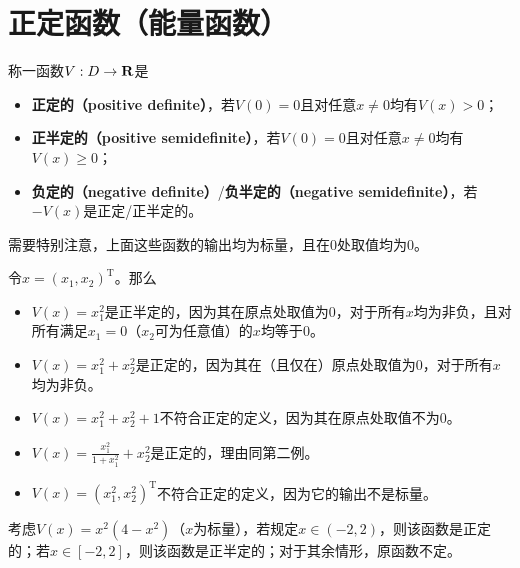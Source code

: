 \section{正定函数（能量函数）}\label{2Bref}
\begin{definition}
  称一函数$V:D\to\mathbf{R}$是\begin{itemize}[leftmargin=1em]
    \item {\bf 正定的（positive definite）}，若$V(0)=0$且对任意$x\ne 0$均有$V(x)>0$；
    \item {\bf 正半定的（positive semidefinite）}，若$V(0)=0$且对任意$x\ne 0$均有$V(x)\ge0$；
    \item {\bf 负定的（negative definite）}/{\bf 负半定的（negative semidefinite）}，若$-V(x)$是正定/正半定的。
  \end{itemize}
\end{definition}
\begin{note}
  需要特别注意，上面这些函数的输出均为标量，且在$0$处取值均为$0$。
\end{note}
\begin{example}[正定、正半定函数]
  令$x=(x_1,x_2)^\mathrm{T}$。那么
  \begin{itemize}[leftmargin=1em]
    \item $V(x)=x_1^2$是正半定的，因为其在原点处取值为$0$，对于所有$x$均为非负，且对所有满足$x_1=0$（$x_2$可为任意值）的$x$均等于$0$。
    \item $V(x)=x_1^2+x_2^2$是正定的，因为其在（且仅在）原点处取值为$0$，对于所有$x$均为非负。
    \item $V(x)=x_1^2+x_2^2+1$不符合正定的定义，因为其在原点处取值不为$0$。
    \item $V(x)=\frac{x_1^2}{1+x_1^2}+x_2^2$是正定的，理由同第二例。
    \item $V(x)=(x_1^2,x_2^2)^\mathrm{T}$不符合正定的定义，因为它的输出不是标量。
  \end{itemize}
\end{example}

\begin{example}[局部正定函数]
  考虑$V(x)=x^2(4-x^2)$（$x$为标量），若规定$x\in(-2,2)$，则该函数是正定的；若$x\in[-2,2]$，则该函数是正半定的；对于其余情形，原函数不定。
\end{example}


